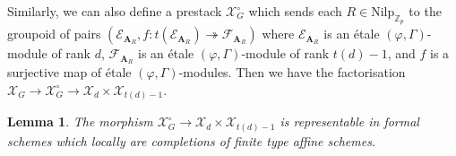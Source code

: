 \documentclass[10pt]{article}
\newtheorem{lem}[thm]{Lemma}
\numberwithin{equation}{section}
\newcommand{\bZ}{{\mathbb Z}}
\newcommand{\calE}{{\mathcal E}}
\newcommand{\calF}{{\mathcal F}}
\newcommand{\calX}{{\mathcal X}}
\newcommand{\Nilp}{\mathrm{Nilp}}
\newcommand{\bfA}{{\textbf{A}}}
\begin{document}
Similarly, we can also define a prestack $\calX_G^{\circ}$ which sends each $R\in \Nilp_{\bZ_p}$ to the groupoid of pairs $(\calE_{\bfA_R},f:t(\calE_{\bfA_R})\twoheadrightarrow \calF_{\bfA_R})$ where $\calE_{\bfA_R}$ is an \'etale $(\varphi,\Gamma)$-module of rank $d$, $\calF_{\bfA_R}$ is an \'etale $(\varphi,\Gamma)$-module of rank $t(d)-1$, and $f$ is a surjective map of \'etale $(\varphi,\Gamma)$-modules. Then we have the factorisation $\calX_G\to \calX_G^{\circ}\to \calX_d\times \calX_{t(d)-1}$.

\begin{lem}\label{surj2}
    The morphism $\calX_G^{\circ}\to \calX_d\times \calX_{t(d)-1}$ is representable in formal schemes which locally are completions  of finite type affine schemes.
\end{lem}
\end{document}
